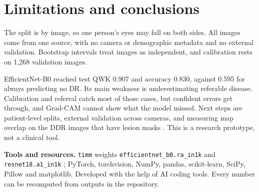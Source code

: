 \documentclass[11pt,a4paper]{article}
\begin{document}
\section{Limitations and conclusions}

The split is by image, so one person's eyes may fall on both sides. All images come from one source, with no camera or demographic metadata and no external validation. Bootstrap intervals treat images as independent, and calibration rests on 1,268 validation images.

EfficientNet-B0 reached test QWK 0.907 and accuracy 0.830, against 0.595 for always predicting no DR. Its main weakness is underestimating referable disease. Calibration and referral catch most of those cases, but confident errors get through, and Grad-CAM cannot show what the model missed. Next steps are patient-level splits, external validation across cameras, and measuring map overlap on the DDR images that have lesion masks \cite{ddr2019}. This is a research prototype, not a clinical tool.

\textbf{Tools and resources.} \texttt{timm} weights \texttt{efficientnet\_b0.ra\_in1k} and \texttt{resnet18.a1\_in1k} \cite{timm}; PyTorch, torchvision, NumPy, pandas, scikit-learn, SciPy, Pillow and matplotlib. Developed with the help of AI coding tools. Every number can be recomputed from outputs in the repository.
\end{document}
